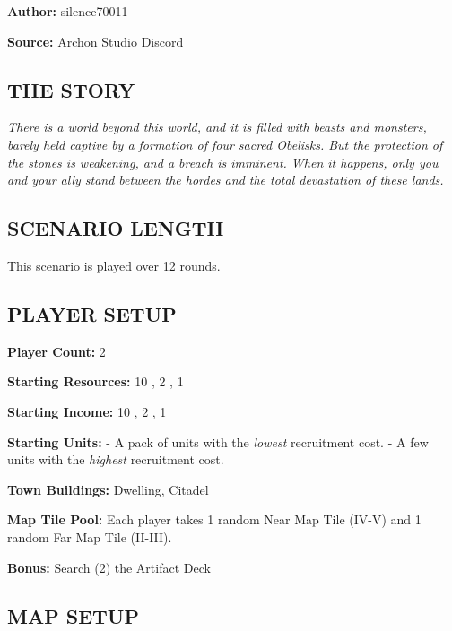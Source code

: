 
\begin{multicols*}{2}

\textbf{Author:} silence70011

\textbf{Source:} \href{https://discord.com/channels/740870068178649108/1233112440322002964/1233112440322002964}{Archon Studio Discord}

\subsection*{\MakeUppercase{The Story}}

\textit{There is a world beyond this world, and it is filled with beasts and monsters, barely held captive by a formation of four sacred Obelisks.
  But the protection of the stones is weakening, and a breach is imminent.
  When it happens, only you and your ally stand between the hordes and the total devastation of these lands.
}

\subsection*{\MakeUppercase{Scenario length}}

This scenario is played over 12 rounds.

\subsection*{\MakeUppercase{Player Setup}}

\textbf{Player Count:} 2

\textbf{Starting Resources:} 10 , 2 , 1 

\textbf{Starting Income:} 10 , 2 , 1 

\textbf{Starting Units:}
- A pack of  units with the \textit{lowest} recruitment cost.
- A few  units with the \textit{highest} recruitment cost.

\textbf{Town Buildings:}  Dwelling, Citadel

\textbf{Map Tile Pool:} Each player takes 1 random Near Map Tile (IV-V) and 1 random Far Map Tile (II-III).

\textbf{Bonus:} Search (2) the Artifact Deck

\subsection*{\MakeUppercase{Map Setup}}


\end{multicols*}
